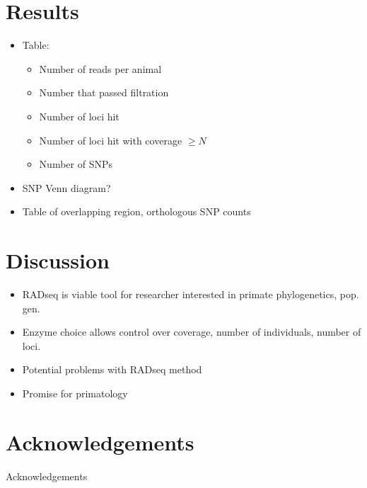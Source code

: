 \documentclass[12pt]{article}
\begin{document}
\section{Results}
\begin{itemize}
	\item Table: 
	\begin{itemize}
		\item Number of reads per animal
		\item Number that passed filtration
		\item Number of loci hit
		\item Number of loci hit with coverage $\ge N$
		\item Number of SNPs
	\end{itemize}
	\item SNP Venn diagram?
	\item Table of overlapping region, orthologous SNP counts
\end{itemize}

\section{Discussion}
\begin{itemize}
	\item RADseq is viable tool for researcher interested in primate phylogenetics, pop. gen.
	\item Enzyme choice allows control over coverage, number of individuals, number of loci.
	\item Potential problems with RADseq method
	\item Promise for primatology
\end{itemize}

\section{Acknowledgements}
Acknowledgements
\end{document}
